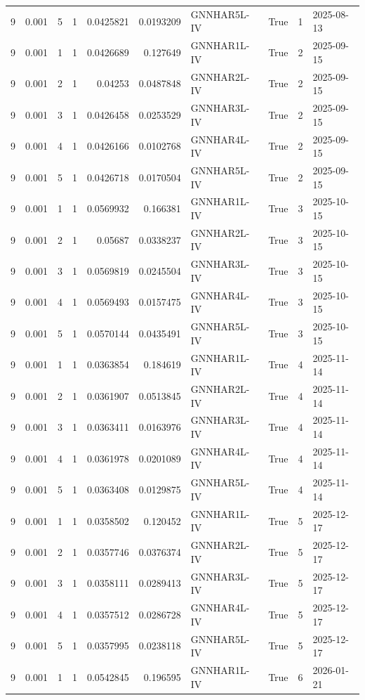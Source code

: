 \begin{tabular}{rrrrrrlrrl}
9 & 0.001 & 5 & 1 & 0.0425821 & 0.0193209 & GNNHAR5L-IV & True & 1 & 2025-08-13 \\
9 & 0.001 & 1 & 1 & 0.0426689 & 0.127649 & GNNHAR1L-IV & True & 2 & 2025-09-15 \\
9 & 0.001 & 2 & 1 & 0.04253 & 0.0487848 & GNNHAR2L-IV & True & 2 & 2025-09-15 \\
9 & 0.001 & 3 & 1 & 0.0426458 & 0.0253529 & GNNHAR3L-IV & True & 2 & 2025-09-15 \\
9 & 0.001 & 4 & 1 & 0.0426166 & 0.0102768 & GNNHAR4L-IV & True & 2 & 2025-09-15 \\
9 & 0.001 & 5 & 1 & 0.0426718 & 0.0170504 & GNNHAR5L-IV & True & 2 & 2025-09-15 \\
9 & 0.001 & 1 & 1 & 0.0569932 & 0.166381 & GNNHAR1L-IV & True & 3 & 2025-10-15 \\
9 & 0.001 & 2 & 1 & 0.05687 & 0.0338237 & GNNHAR2L-IV & True & 3 & 2025-10-15 \\
9 & 0.001 & 3 & 1 & 0.0569819 & 0.0245504 & GNNHAR3L-IV & True & 3 & 2025-10-15 \\
9 & 0.001 & 4 & 1 & 0.0569493 & 0.0157475 & GNNHAR4L-IV & True & 3 & 2025-10-15 \\
9 & 0.001 & 5 & 1 & 0.0570144 & 0.0435491 & GNNHAR5L-IV & True & 3 & 2025-10-15 \\
9 & 0.001 & 1 & 1 & 0.0363854 & 0.184619 & GNNHAR1L-IV & True & 4 & 2025-11-14 \\
9 & 0.001 & 2 & 1 & 0.0361907 & 0.0513845 & GNNHAR2L-IV & True & 4 & 2025-11-14 \\
9 & 0.001 & 3 & 1 & 0.0363411 & 0.0163976 & GNNHAR3L-IV & True & 4 & 2025-11-14 \\
9 & 0.001 & 4 & 1 & 0.0361978 & 0.0201089 & GNNHAR4L-IV & True & 4 & 2025-11-14 \\
9 & 0.001 & 5 & 1 & 0.0363408 & 0.0129875 & GNNHAR5L-IV & True & 4 & 2025-11-14 \\
9 & 0.001 & 1 & 1 & 0.0358502 & 0.120452 & GNNHAR1L-IV & True & 5 & 2025-12-17 \\
9 & 0.001 & 2 & 1 & 0.0357746 & 0.0376374 & GNNHAR2L-IV & True & 5 & 2025-12-17 \\
9 & 0.001 & 3 & 1 & 0.0358111 & 0.0289413 & GNNHAR3L-IV & True & 5 & 2025-12-17 \\
9 & 0.001 & 4 & 1 & 0.0357512 & 0.0286728 & GNNHAR4L-IV & True & 5 & 2025-12-17 \\
9 & 0.001 & 5 & 1 & 0.0357995 & 0.0238118 & GNNHAR5L-IV & True & 5 & 2025-12-17 \\
9 & 0.001 & 1 & 1 & 0.0542845 & 0.196595 & GNNHAR1L-IV & True & 6 & 2026-01-21 \\

\end{tabular}

